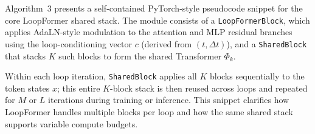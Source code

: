 Algorithm~3 presents a self-contained PyTorch-style pseudocode snippet for the core LoopFormer shared stack. The module consists of a \texttt{LoopFormerBlock}, which applies AdaLN-style modulation to the attention and MLP residual branches using the loop-conditioning vector $c$ (derived from $(t,\Delta t)$), and a \texttt{SharedBlock} that stacks $K$ such blocks to form the shared Transformer $\Phi_k$.

Within each loop iteration, \texttt{SharedBlock} applies all $K$ blocks sequentially to the token states $x$; this entire $K$-block stack is then reused across loops and repeated for $M$ or $L$ iterations during training or inference. This snippet clarifies how LoopFormer handles multiple blocks per loop and how the same shared stack supports variable compute budgets.

\newpage

